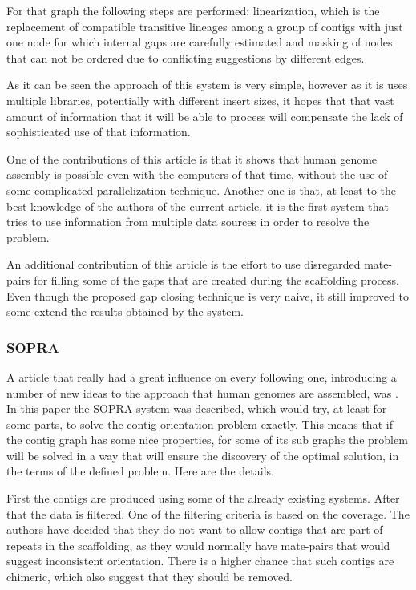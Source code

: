 \documentclass[11pt]{article}
\begin{document}
For that graph the following steps are performed: linearization, which is the
replacement of compatible transitive lineages among a group of contigs with just
one node for which internal gaps are carefully estimated and masking of
nodes that can not be ordered due to conflicting suggestions by different edges.

As it can be seen the approach of this system is very simple, however as it is
uses multiple libraries, potentially with different insert sizes, it hopes that
that vast amount of information that it will be able to process will compensate
the lack of sophisticated use of that information. 

One of the contributions of this article is that it shows that human genome
assembly is possible even with the computers of that time, without the use of
some complicated parallelization technique. Another one is that, at least to the
best knowledge of the authors of the current article, it is the first system
that tries to use information from multiple data sources in order to resolve the
problem.

An additional contribution of this article is the effort to use disregarded
mate-pairs for filling some of the gaps that are created during the scaffolding
process. Even though the proposed gap closing technique is very naive, it still
improved to some extend the results obtained by the system.

\subsubsection{SOPRA} %
\label{ssub:SOPRA}
A article that really had a great influence on every following one, introducing
a number of new ideas to the approach that human genomes are assembled, was
\cite{SOPRA}. In this paper the SOPRA system was described, which would try, at
least for some parts, to solve the contig orientation problem exactly. This means
that if the contig graph has some nice properties, for some of its sub graphs
the problem will be solved in a way that will ensure the discovery of the
optimal solution, in the terms of the defined problem. Here are the details.

First the contigs are produced using some of the already existing systems. After
that the data is filtered. One of the filtering criteria is based on the
coverage. The authors have decided that they do not want to allow contigs that
are part of repeats in the scaffolding, as they would normally have mate-pairs
that would suggest inconsistent orientation. There is a higher chance that such
contigs are chimeric, which also suggest that they should be removed.
\end{document}
